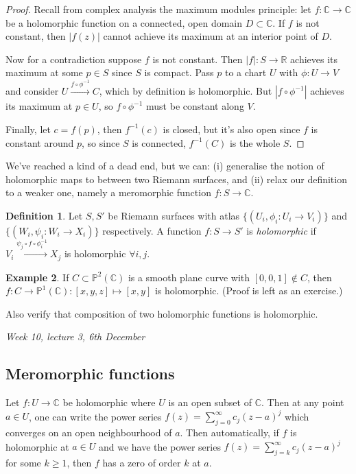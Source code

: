 \documentclass{article}
\newcommand{\R}{\mathbb{R}}
\newcommand{\C}{\mathbb{C}}
\newcommand{\p}{\mathbb{P}}
\theoremstyle{definition}
\newtheorem{defn}{Definition}[subsection]
\newtheorem{example}[defn]{Example}
\begin{document}
\begin{proof}
Recall from complex analysis the maximum modules principle: let $f:\C\rightarrow\C$ be a holomorphic function on a connected, open domain $D\subset\C$. If $f$ is not constant, then $|f(z)|$ cannot achieve its maximum at an interior point of $D$.

Now for a contradiction suppose $f$ is not constant. Then $|f|:S\rightarrow\R$ achieves its maximum at some $p\in S$ since $S$ is compact. Pass $p$ to a chart $U$ with $\phi:U\rightarrow V$ and consider $U\xrightarrow{f\circ\phi^{-1}}C$, which by definition is holomorphic. But $|f\circ\phi^{-1}|$ achieves its maximum at $p\in U$, so $f\circ\phi^{-1}$ must be constant along $V$.

Finally, let $c=f(p)$, then $f^{-1}(c)$ is closed, but it's also open since $f$ is constant around $p$, so since $S$ is connected, $f^{-1}(C)$ is the whole $S$.
\end{proof}

We've reached a kind of a dead end, but we can: (i) generalise the notion of holomorphic maps to between two Riemann surfaces, and (ii) relax our definition to a weaker one, namely a meromorphic function $f:S\rightarrow\C$.

\begin{defn}
Let $S,S'$ be Riemann surfaces with atlas $\{(U_i,\phi_i:U_i\rightarrow V_i)\}$ and $\{(W_i,\psi_i:W_i\rightarrow X_i)\}$ respectively. A function $f:S\rightarrow S'$ is \textit{holomorphic} if $V_i\xrightarrow{\psi_j\circ f\circ\phi_i^{-1}}X_j$ is holomorphic $\forall i,j$.
\end{defn}

\begin{example}
If $C\subset\p^2(\C)$ is a smooth plane curve with $[0,0,1]\notin C$, then $f:C\rightarrow\p^1(\C):[x,y,z]\mapsto[x,y]$ is holomorphic. (Proof is left as an exercise.)

Also verify that composition of two holomorphic functions is holomorphic.
\end{example}

\begin{flushright}
\textit{Week 10, lecture 3, 6th December}
\end{flushright}

\subsection{Meromorphic functions}
Let $f:U\rightarrow\C$ be holomorphic where $U$ is an open subset of $\C$. Then at any point $a\in U$, one can write the power series $f(z)=\sum_{j=0}^\infty c_j(z-a)^j$ which converges on an open neighbourhood of $a$. Then automatically, if $f$ is holomorphic at $a\in U$ and we have the power series $f(z)=\sum_{j=k}^\infty c_j(z-a)^j$ for some $k\geq 1$, then $f$ has a zero of order $k$ at $a$.
\end{document}
